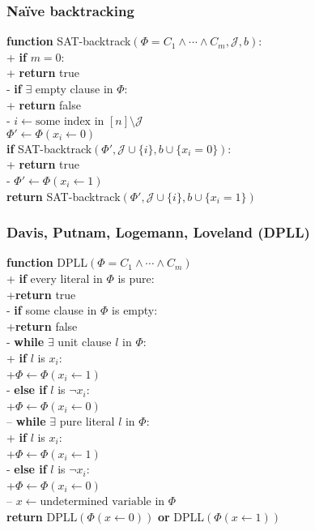 \documentclass{article}
\begin{document}
\subsubsection{Na\"ive backtracking}

\begin{pseudo}
\textbf{function} \textsf{SAT-backtrack}$(\Phi=C_1\wedge\cdots\wedge C_m, \mathcal{J}, b)$:\\+
	\textbf{if} $m=0$:\\+ \textbf{return} \textsf{true}\\-
	\textbf{if} $\exists$ empty clause in $\Phi$:\\+
		\textbf{return} \textsf{false}\\-
    $i\leftarrow\text{some index in $[n]\setminus\mathcal{J}$}$\\
	$\Phi'\leftarrow\Phi(x_i\leftarrow 0)$\\
	\textbf{if} \textsf{SAT-backtrack}$(\Phi', \mathcal{J}\cup\{i\}, b\cup\{x_i=0\})$:\\+
		\textbf{return} \textsf{true}\\-
	$\Phi'\leftarrow\Phi(x_i\leftarrow 1)$\\
	\textbf{return} \textsf{SAT-backtrack}$(\Phi',\mathcal{J}\cup\{i\}, b\cup\{x_i=1\})$
\end{pseudo}

\subsubsection{Davis, Putnam, Logemann, Loveland (DPLL)}

\begin{pseudo}
\textbf{function} \textsf{DPLL}$(\Phi=C_1\wedge\cdots\wedge C_m)$\\+
	\textbf{if} every literal in $\Phi$ is pure:\\+\textbf{return} \textsf{true}\\-
	\textbf{if} some clause in $\Phi$ is empty:\\+\textbf{return} \textsf{false}\\-
	\textbf{while} $\exists$ unit clause $l$ in $\Phi$:\\+
		\textbf{if} $l$ is $x_i$:\\+$\Phi\leftarrow\Phi(x_i\leftarrow 1)$\\-
		\textbf{else if} $l$ is $\neg x_i$:\\+$\Phi\leftarrow\Phi(x_i\leftarrow 0)$\\--
	\textbf{while} $\exists$ pure literal $l$ in $\Phi$:\\+
		\textbf{if} $l$ is $x_i$:\\+$\Phi\leftarrow\Phi(x_i\leftarrow 1)$\\-
		\textbf{else if} $l$ is $\neg x_i$:\\+$\Phi\leftarrow\Phi(x_i\leftarrow 0)$\\--
    $x\leftarrow\text{undetermined variable in }\Phi$\\
	\textbf{return} \textsf{DPLL}$(\Phi(x\leftarrow 0))$ 
	\textbf{or}     \textsf{DPLL}$(\Phi(x\leftarrow 1))$
\end{pseudo}
\end{document}
